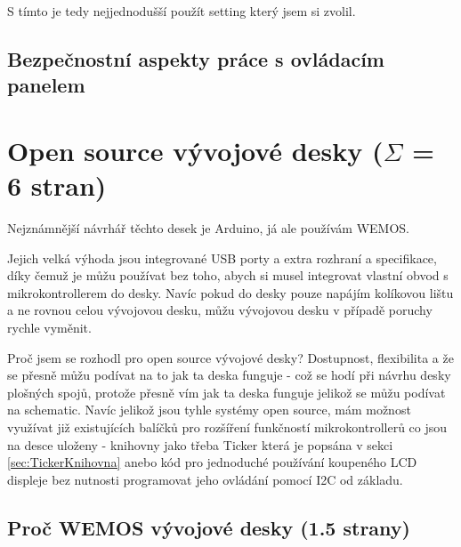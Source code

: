 S tímto je tedy nejjednodušší použít setting který jsem si zvolil.

\subsection{Bezpečnostní aspekty práce s ovládacím panelem}

\section{Open source vývojové desky ($\Sigma$ = 6 stran)}

Nejznámnější návrhář těchto desek je Arduino, já ale používám WEMOS.

Jejich velká výhoda jsou integrované USB porty a extra rozhraní a specifikace, díky čemuž je můžu používat bez toho, abych si musel integrovat vlastní obvod s mikrokontrollerem do desky. Navíc pokud do desky pouze napájím kolíkovou lištu a ne rovnou celou vývojovou desku, můžu vývojovou desku v případě poruchy rychle vyměnit.

Proč jsem se rozhodl pro open source vývojové desky? Dostupnost, flexibilita a že se přesně můžu podívat na to jak ta deska funguje - což se hodí při návrhu desky plošných spojů, protože přesně vím jak ta deska funguje jelikož se můžu podívat na schematic. Navíc jelikož jsou tyhle systémy open source, mám možnost využívat již existujících balíčků pro rozšíření funkčností mikrokontrollerů co jsou na desce uloženy - knihovny jako třeba Ticker která je popsána v sekci \ref{sec:TickerKnihovna} anebo kód pro jednoduché používání koupeného LCD displeje bez nutnosti programovat jeho ovládání pomocí I2C od základu.


\subsection{Proč WEMOS vývojové desky (1.5 strany)}

